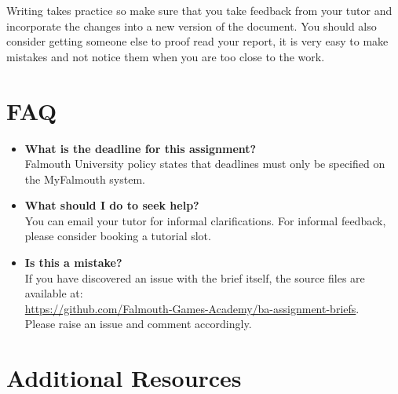 \documentclass{../../fal_assignment}
\begin{document}
Writing takes practice so make sure that you take feedback from your tutor and incorporate the changes into a new version of the document. You should also consider getting someone else to proof read your report, it is very easy to make mistakes and not notice them when you are too close to the work.

\section*{FAQ}

\begin{itemize}
	\item 	\textbf{What is the deadline for this assignment?} \\ 
    		Falmouth University policy states that deadlines must only be specified on the MyFalmouth system.
    		
	\item 	\textbf{What should I do to seek help?} \\ 
    		You can email your tutor for informal clarifications. For informal feedback, please consider booking a tutorial slot.
    		
    	\item 	\textbf{Is this a mistake?} \\ 	
    		If you have discovered an issue with the brief itself, the source files are available at: \\
    		\url{https://github.com/Falmouth-Games-Academy/ba-assignment-briefs}.\\
    		 Please raise an issue and comment accordingly.
\end{itemize}

\section*{Additional Resources}
\end{document}
